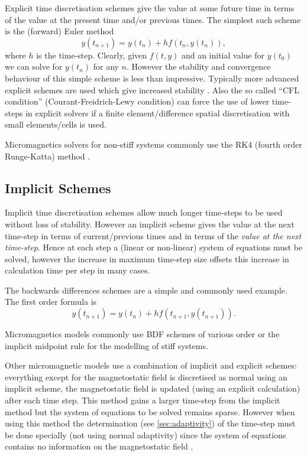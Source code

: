 Explicit time discretisation schemes give the value at some future time in terms of the value at the present time and/or previous times. The simplest such scheme is the (forward) Euler method
\begin{equation}
  \label{eq:44}
  y(t_{n+1}) = y(t_n) + h f(t_n,y(t_n)),
\end{equation}
where $h$ is the time-step. 
Clearly, given $f(t,y)$ and an initial value for $y(t_0)$ we can solve for $y(t_n)$ for any $n$. However the stability and convergence behaviour of this simple scheme is less than impressive. Typically more advanced explicit schemes are used which give increased stability \cite{Atkinson2009}.
Also the so called ``CFL condition'' (Courant-Freidrich-Lewy condition) can force the use of lower time-steps in explicit solvers if a finite element/difference spatial discretisation with small elements/cells is used.

Micromagnetics solvers for non-stiff systems commonly use the RK4 (fourth order Runge-Katta) method \cite{Suess2002}.


\subsection{Implicit Schemes}
\label{sec:implicit-schemes}

Implicit time discretisation schemes allow much longer time-steps to be used without loss of stability.
However an implicit scheme gives the value at the next time-step in terms of current/previous times and in terms of the \emph{value at the next time-step}.
Hence at each step a (linear or non-linear) system of equations must be solved, however the increase in maximum time-step size offsets this increase in calculation time per step in many cases.

The backwards differences schemes are a simple and commonly used example. The first order formula is
\begin{equation}
  \label{eq:48}
  y(t_{n+1}) = y(t_n) + hf(t_{n+1}, y(t_{n+1})).
\end{equation}

Micromagnetics models commonly use BDF schemes of various order \cite{Suess2002} or the implicit midpoint rule \cite{DAquino2005} for the modelling of stiff systems.

Other micromagnetic models use a combination of implicit and explicit schemes: everything except for the magnetostatic field is discretised as normal using an implicit scheme, the magnetostatic field is updated (using an explicit calculation) after each time step. 
This method gains a larger time-step from the implicit method but the system of equations to be solved remains sparse.
However when using this method the determination (see \autoref{sec:adaptivity}) of the time-step must be done specially (\ie not using normal adaptivity) since the system of equations contains no information on the magnetostatic field \cite{Schrefl1997}.

